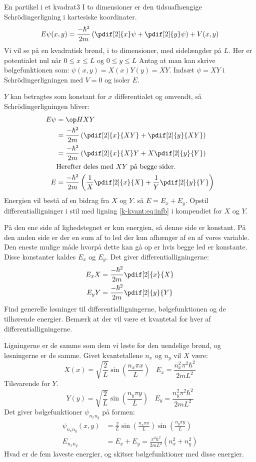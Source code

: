 \begin{opgave}{En partikel i et kvadrat}{3}
\label{kvant:opg:2dinf}
I to dimensioner er den tidsuafhængige Schrödingerligning i kartesiske koordinater.
$$
E\psi(x,y) = \frac{-\hbar^2}{2m}\left(\pdif[2]{x}\psi +\pdif[2]{y}\psi\right) + V(x,y)
$$
Vi vil se på en kvadratisk brønd, i to dimensioner, med sidelængder på $L$. Her er potentialet nul når $0\leq x\leq L$ og $0\leq y\leq L$
Antag at man kan skrive bølgefunktionen som: $\psi(x,y) = X(x)Y(y) = XY$.
\opg Indsæt $\psi = XY$ i Schrödingerligningen med $V=0$ og isoler $E$.

$Y$ kan betragtes som konstant for $x$ differentialet og omvendt, så Schrödingerligningen bliver:
\begin{align*}
    E\psi &= \op HXY\\
    &= \frac{-\hbar^2}{2m}\left(\pdif[2]{x}{XY}+\pdif[2]{y}{XY}\right)\\
    &= \frac{-\hbar^2}{2m}\left(\pdif[2]{x}{X}Y+X\pdif[2]{y}{Y}\right)\\
    &\text{Herefter deles med $XY$ på begge sider.}\\
    E &= \frac{-\hbar^2}{2m}\left(\frac{1}{X}\pdif[2]{x}{X}+\frac{1}{Y}\pdif[2]{y}{Y}\right)
\end{align*}
\opg Energien vil bestå af en bidrag fra $X$ og $Y$. så $E=E_x+E_y$. Opstil differentialligninger i stil med ligning \eqref{k-kvant:eq:infb} i kompendiet for $X$ og $Y$.

På den ene side af lighedstegnet er kun energien, så denne side er konstant. På den anden side er der en sum af to led der kun afhænger af en af vores variable. Den eneste mulige måde hvorpå dette kan gå op er hvis begge led er konstante. Disse konstanter kaldes $E_x$ og $E_y$. Det giver differentialligningerne:
\begin{align*}
    E_x X &= \frac{-\hbar^2}{2m}\pdif[2]{x}{X}\\
    E_y Y &= \frac{-\hbar^2}{2m}\pdif[2]{y}{Y}
\end{align*}
\opg Find generelle løsninger til differentialligningerne, bølgefunktionen og de tilhørende energier. Bemærk at der vil være et kvantetal for hver af differentialligningerne.

Ligningerne er de samme som dem vi løste for den uendelige brønd, og løsningerne er de samme.
Givet kvantetallene $n_x$ og $n_y$ vil $X$ være:
$$
X(x) = \sqrt{\frac{2}{L}}\sin\left(\frac{n_x\pi x}{L}\right)~~~~E_x = \frac{n_x^2\pi^2\hbar^2}{2mL^2}
$$
Tilsvarende for $Y$.
$$
Y(y) = \sqrt{\frac{2}{L}}\sin\left(\frac{n_y\pi y}{L}\right)~~~~E_y = \frac{n_y^2\pi^2\hbar^2}{2mL^2}
$$
Det giver bølgefunktioner $\psi_{n_xn_y}$ på formen:
\begin{align*}
    \psi_{n_xn_y}(x,y) &= \frac{2}{L}\sin\left(\frac{n_x\pi x}{L}\right)\sin\left(\frac{n_y\pi y}{L}\right)\\
    E_{n_xn_y} &= E_x+E_y = \frac{\pi^2\hbar^2}{2mL^2}(n_x^2+n_y^2)
\end{align*}
\opg Hvad er de fem laveste energier, og skitser bølgefunktioner med disse energier.


\end{opgave}
